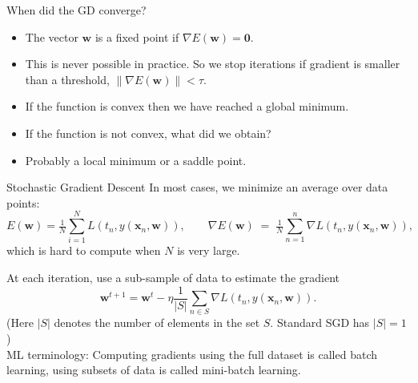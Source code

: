 \documentclass[handout,aspectratio=169]{beamer}
\begin{document}
\begin{frame}{When did the GD converge?}
	\begin{itemize}
		\item The vector $\mathbf w$ is a fixed point if $\nabla E(\mathbf w)=\mathbf 0$.\\[3mm]
		\item This is never possible in practice. So we stop iterations if gradient is smaller than a threshold, $\|\nabla E(\mathbf w)\|<\tau$. \\[3mm]
		\item If the function is convex then we have reached a global minimum.\\[3mm]
		\item If the function is not convex, what did we obtain?\\[3mm]
		\item Probably a local minimum or a saddle point. 
	\end{itemize}
\end{frame}



\begin{frame}{Stochastic Gradient Descent}
In most cases, we minimize an average over data points: $$E(\mathbf w)=\tfrac1N\sum_{i=1}^N L(t_n,y(\mathbf x_n,\mathbf w)),\qquad \nabla E(\mathbf w)\;=\;\tfrac1N\sum_{n=1}^n \nabla L(t_n,y(\mathbf x_n,\mathbf w)),$$
which is hard to compute when $N$ is very large.

At each iteration, use a sub-sample of data  to estimate the gradient
$$
\mathbf w^{t+1}=\mathbf w^t-\eta\frac{1}{|S|}\sum_{n\in S}\nabla L(t_n,y(\mathbf x_n,\mathbf w)).
$$
{\small (Here $|S|$ denotes the number of elements in the set $S$. Standard SGD has $|S|=1$)}\\[3mm]
ML terminology: Computing gradients using the full dataset is called \alert{batch learning}, using subsets of data is called \alert{mini-batch learning}.
\end{frame}
\end{document}
